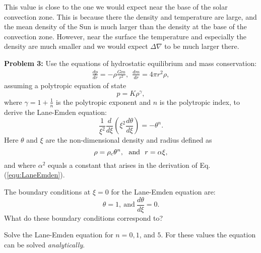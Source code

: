 \documentclass[12pt]{article}
\begin{document}
This value is close to the one we would expect near the base of the
solar convection zone. This is because there the density and
temperature are large, and the mean density of the Sun is much larger
than the density at the base of the convection zone. However, near the
surface the temperature and especially the density are much smaller
and we would expect $\Delta\nabla$ to be much larger there.



{\bf Problem 3:} Use the equations of hydrostatic equilibrium and mass
conservation:
\begin{eqnarray}
  \frac{dp}{dr} = -\rho \frac{Gm}{r^2},\ \ \frac{dm}{dr} = 4\pi r^2\rho, 
\end{eqnarray}
assuming a polytropic equation of state
\begin{equation}
p = K \rho^\gamma,
\end{equation}
where $\gamma = 1 + \frac{1}{n}$ is the polytropic exponent and $n$ is
the polytropic index, to derive the Lane-Emden equation:
\begin{equation}
\frac{1}{\xi^2} \frac{d}{d\xi} \left(\xi^2 \frac{d\theta}{d\xi} \right) = -\theta^n.\label{equ:LaneEmden}
\end{equation}
Here $\theta$ and $\xi$ are the non-dimensional density and radius
defined as
\begin{equation}
\rho = \rho_{\rm c} \theta^n, \ \ \mbox{and}\ \ r = \alpha\xi,
\end{equation}
and where $\alpha^2$ equals a constant that arises in the derivation
of Eq.(\ref{equ:LaneEmden}).

The boundary conditions at $\xi=0$ for the Lane-Emden equation are:
\begin{equation}
\theta = 1,\ \mbox{and}\ \frac{d\theta}{d\xi} = 0.
\end{equation}
What do these boundary conditions correspond to?

Solve the Lane-Emden equation for $n=0,1$, and $5$. For these values
the equation can be solved \emph{analytically}.
\end{document}
